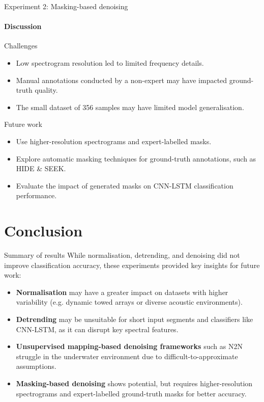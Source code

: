\documentclass[]{beamer}
\begin{document}
\begin{frame}{Experiment 2: Masking-based denoising}
    \framesubtitle{Discussion}
    \small
    
    \begin{alertblock}{Challenges}
        \begin{itemize}
            \item Low spectrogram resolution led to limited frequency details.
            \item Manual annotations conducted by a non-expert may have impacted ground-truth quality.
            \item The small dataset of 356 samples may have limited model generalisation.
        \end{itemize}
    \end{alertblock}

    \begin{block}{Future work}
        \begin{itemize}
            \item Use higher-resolution spectrograms and expert-labelled masks.
            \item Explore automatic masking techniques for ground-truth annotations, such as HIDE \& SEEK.  
            \item Evaluate the impact of generated masks on CNN-LSTM classification performance.
        \end{itemize}
    \end{block}
\end{frame}


\section{Conclusion}

\begin{frame}{Summary of results}
    \small
    While normalisation, detrending, and denoising did not improve classification accuracy, these experiments provided key insights for future work:
    \begin{itemize}
        \item \textbf{Normalisation} may have a greater impact on datasets with higher variability (e.g. dynamic towed arrays or diverse acoustic environments).
        \item \textbf{Detrending} may be unsuitable for short input segments and classifiers like CNN-LSTM, as it can disrupt key spectral features.
        \item \textbf{Unsupervised mapping-based denoising frameworks} such as N2N struggle in the underwater environment due to difficult-to-approximate assumptions.
        \item \textbf{Masking-based denoising} shows potential, but requires higher-resolution spectrograms and expert-labelled ground-truth masks for better accuracy.
    \end{itemize}
\end{frame}
\end{document}
